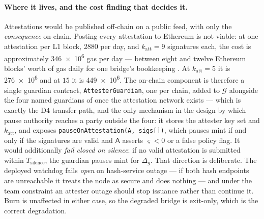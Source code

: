 \paragraph{Where it lives, and the cost finding that decides it.} Attestations would be published
off-chain on a public feed, with only the \emph{consequence} on-chain. Posting every attestation to
Ethereum is not viable: at one attestation per L1 block, \num{2880} per day, and
$k_{\mathrm{att}} = 9$ signatures each, the cost is approximately \num{346e6} gas per day ---
between eight and twelve Ethereum blocks' worth of gas daily for one bridge's bookkeeping
\srcinferred. At $k_{\mathrm{att}} = 5$ it is \num{276e6} and at $15$ it is \num{449e6}. The
on-chain component is therefore a single guardian contract, \texttt{Attester\allowbreak{}Guardian}, one per
chain, added to $\mathcal{G}$ alongside the four named guardians of  once
the attestation network exists --- which is exactly the D4 transfer path, and the only mechanism in
the design by which pause authority reaches a party outside the four: it stores the attester key set
and $k_{\mathrm{att}}$, and
exposes \texttt{pause\allowbreak{}On\allowbreak{}Attestation(A, sigs[])}, which pauses mint if and only if the signatures are
valid and $\mathsf{A}$ asserts $\varsigma < 0$ or a false policy flag. It would additionally
\emph{fail closed on silence}: if no valid attestation is submitted within $T_{\mathrm{silence}}$,
the guardian pauses mint for $\Delta_g$. That direction is deliberate. The deployed \SAS watchdog
fails \emph{open} on hash-service outage --- if both hash endpoints are unreachable it treats the
node as secure and does nothing  --- and under the team
constraint an attester outage should stop issuance rather than continue it. Burn is unaffected in
either case, so the degraded bridge is exit-only, which is the correct degradation.

